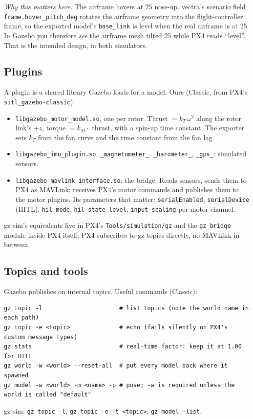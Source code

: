 \documentclass[11pt,a4paper]{article}
\newcommand{\file}[1]{\texttt{#1}}
\newcommand{\param}[1]{\texttt{#1}}
\newcommand{\why}[1]{\par\smallskip\noindent\textit{Why this matters here:} #1\par}
\begin{document}
\why{The airframe hovers at 25\textdegree{} nose-up. vectra's scenario field
\param{frame.hover\_pitch\_deg} rotates the airframe geometry into the flight-controller frame, so
the exported model's \file{base\_link} is level when the real airframe is at 25\textdegree. In
Gazebo you therefore \emph{see} the airframe mesh tilted 25\textdegree{} while PX4 reads ``level''.
That is the intended design, in both simulators.}

\subsection{Plugins}
A plugin is a shared library Gazebo loads for a model. Ours (Classic, from PX4's
\file{sitl\_gazebo-classic}):
\begin{itemize}
  \item \file{libgazebo\_motor\_model.so}, one per rotor. Thrust $= k_T\,\omega^2$ along the
        rotor link's $+z$, torque $= k_M \cdot$ thrust, with a spin-up time constant. The
        exporter sets $k_T$ from the fan curve and the time constant from the fan lag.
  \item \file{libgazebo\_imu\_plugin.so}, \file{\_magnetometer\_}, \file{\_barometer\_},
        \file{\_gps\_}: simulated sensors.
  \item \file{libgazebo\_mavlink\_interface.so}: the bridge. Reads sensors, sends them to PX4 as
        MAVLink; receives PX4's motor commands and publishes them to the motor plugins. Its
        parameters that matter: \param{serialEnabled}, \param{serialDevice} (HITL),
        \param{hil\_mode}, \param{hil\_state\_level}, \param{input\_scaling} per motor channel.
\end{itemize}
gz sim's equivalents live in PX4's \file{Tools/simulation/gz} and the \file{gz\_bridge} module
inside PX4 itself; PX4 subscribes to gz topics directly, no MAVLink in between.

\subsection{Topics and tools}
Gazebo publishes on internal topics. Useful commands (Classic):
\begin{lstlisting}
gz topic -l                      # list topics (note the world name in each path)
gz topic -e <topic>              # echo (fails silently on PX4's custom message types)
gz stats                         # real-time factor: keep it at 1.00 for HITL
gz world -w <world> --reset-all  # put every model back where it spawned
gz model -w <world> -m <name> -p # pose; -w is required unless the world is called "default"
\end{lstlisting}
gz sim: \file{gz topic -l}, \file{gz topic -e -t <topic>}, \file{gz model --list}.
\end{document}
